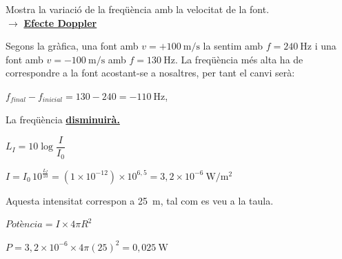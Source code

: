 
\begin{solapartat}
 Mostra la variació de la freqüència amb la velocitat de la font.\\
$\rightarrow$ \underline{\textbf{Efecte Doppler}}

 Segons la gràfica, una font amb $v = +100\ \mathrm{m/s}$ la sentim amb $f = 240\ \mathrm{Hz}$ i una font amb $v = -100\ \mathrm{m/s}$ amb $f = 130\ \mathrm{Hz}$. La freqüència més alta ha de correspondre a la font acostant-se a nosaltres, per tant el canvi serà:

 $f_\mathit{final} - f_\mathit{inicial} = 130 - 240 = -110\ \mathrm{Hz}$,

 La freqüència \underline{\textbf{disminuirà.}}
\end{solapartat}

\begin{solapartat}
 $L_I = 10\log\dfrac{I}{I_0}$

 $I = I_0\,10^{\frac{L_I}{10}} = (1\times 10^{-12})\times 10^{6,5} = 3,2\times 10^{-6}\ \mathrm{W/m^2}$ \quad {}

 Aquesta intensitat correspon a 25~m, tal com es veu a la taula.

 $\textit{Potència} = I\times 4\pi R^2$

 $P = 3,2\times 10^{-6}\times 4\pi(25)^2 = 0,025\ \mathrm{W}$
\end{solapartat}
